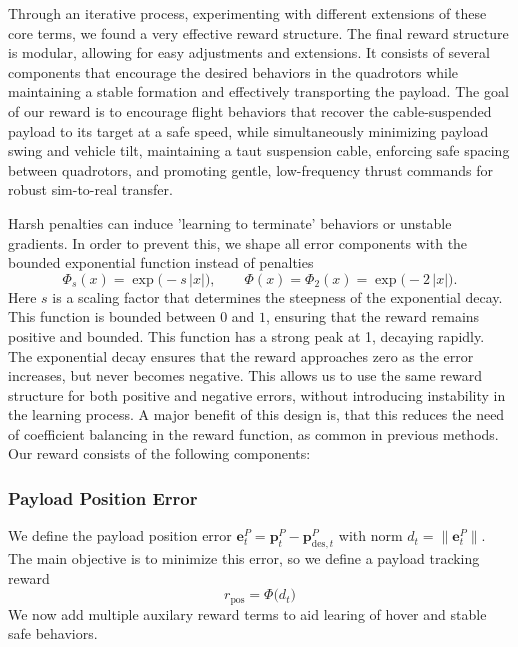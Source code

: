 Through an iterative process, experimenting with different extensions of these core terms, we found a very effective reward structure. The final reward structure is modular, allowing for easy adjustments and extensions. It consists of several components that encourage the desired behaviors in the quadrotors while maintaining a stable formation and effectively transporting the payload.
The goal of our reward is to encourage flight behaviors that recover the cable-suspended payload to its target at a safe speed, while simultaneously minimizing payload swing and vehicle tilt, maintaining a taut suspension cable, enforcing safe spacing between quadrotors, and promoting gentle, low-frequency thrust commands for robust sim-to-real transfer. 

Harsh penalties can induce 'learning to terminate' behaviors or unstable gradients. In order to prevent this, we shape all error components with the bounded exponential function instead of penalties
\begin{equation}
\Phi_s(x) = \exp\bigl(-s\,\lvert x\rvert\bigr),
\qquad
\Phi(x) = \Phi_2(x) = \exp\bigl(-2\,\lvert x\rvert\bigr).
\end{equation}
Here $s$ is a scaling factor that determines the steepness of the exponential decay. This function is bounded between $0$ and $1$, ensuring that the reward remains positive and bounded. This function has a strong peak at 1, decaying rapidly. The exponential decay ensures that the reward approaches zero as the error increases, but never becomes negative. This allows us to use the same reward structure for both positive and negative errors, without introducing instability in the learning process. A major benefit of this design is, that this reduces the need of coefficient balancing in the reward function, as common in previous methods. Our reward consists of the following components:
\subsubsection{Payload Position Error}
We define the payload position error \(\mathbf{e}^P_t = \mathbf{p}^P_t - \mathbf{p}^P_{\mathrm{des},t}\) with norm \(d_t = \|\mathbf{e}^P_t\|\). The main objective is to minimize this error, so we define a payload tracking reward
\begin{equation}
r_{\mathrm{pos}} = \Phi\bigl(d_t\bigr)
\end{equation}
We now add multiple auxilary reward terms to aid learing of hover and stable safe behaviors.
